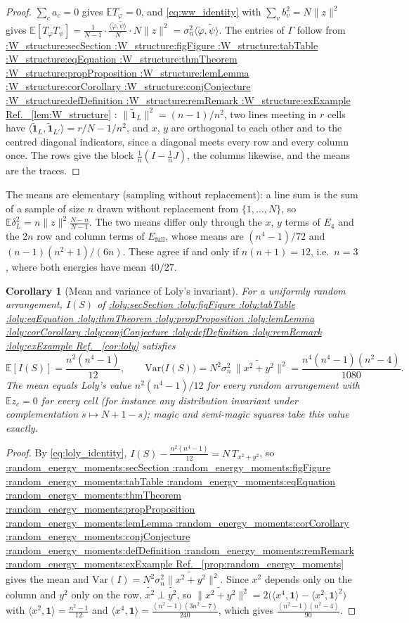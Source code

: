 \documentclass[11pt,a4paper]{article}
\makeatletter
\def\Cref@getprefix#1:#2\relax{#1}
\def\Cref@prefix@sec{sec}
\def\Cref@prefix@fig{fig}
\def\Cref@prefix@tab{tab}
\def\Cref@prefix@eq{eq}
\def\Cref@prefix@thm{thm}
\def\Cref@prefix@prop{prop}
\def\Cref@prefix@lem{lem}
\def\Cref@prefix@cor{cor}
\def\Cref@prefix@conj{conj}
\def\Cref@prefix@def{def}
\def\Cref@prefix@rem{rem}
\def\Cref@prefix@ex{ex}
\def\Cref@type@cap#1{%
  \edef\Cref@tmp{#1}%
  \ifx\Cref@tmp\Cref@prefix@sec Section%
  \else\ifx\Cref@tmp\Cref@prefix@fig Figure%
  \else\ifx\Cref@tmp\Cref@prefix@tab Table%
  \else\ifx\Cref@tmp\Cref@prefix@eq Equation%
  \else\ifx\Cref@tmp\Cref@prefix@thm Theorem%
  \else\ifx\Cref@tmp\Cref@prefix@prop Proposition%
  \else\ifx\Cref@tmp\Cref@prefix@lem Lemma%
  \else\ifx\Cref@tmp\Cref@prefix@cor Corollary%
  \else\ifx\Cref@tmp\Cref@prefix@conj Conjecture%
  \else\ifx\Cref@tmp\Cref@prefix@def Definition%
  \else\ifx\Cref@tmp\Cref@prefix@rem Remark%
  \else\ifx\Cref@tmp\Cref@prefix@ex Example%
  \else Ref.%
  \fi\fi\fi\fi\fi\fi\fi\fi\fi\fi\fi\fi
}
\DeclareRobustCommand{\Cref}[1]{%
  \begingroup
  \edef\Cref@label{#1}%
  \edef\Cref@prefix{\expandafter\Cref@getprefix\Cref@label:\relax}%
  \hyperref[#1]{\Cref@type@cap{\Cref@prefix}~\ref*{#1}}%
  \endgroup
}
\theoremstyle{plain}
\newtheorem{corollary}[theorem]{Corollary}
\theoremstyle{definition}
\theoremstyle{remark}
\newcommand{\Var}{\mathrm{Var}}
\newcommand{\Efull}{E_{\mathrm{full}}}
\newcommand{\Efour}{E_4}
\newcommand{\E}{\mathbb{E}}
\makeatother
\begin{document}
\begin{proof}
$\sum_ca_c=0$ gives $\E T_\varphi=0$, and \eqref{eq:ww_identity} with $\sum_vb_v^2=N\|z\|^2$ gives $\E[T_\varphi T_\psi]=\frac1{N-1}\cdot\frac{\langle\tilde\varphi,\tilde\psi\rangle}{N}\cdot N\|z\|^2=\sigma_n^2\langle\tilde\varphi,\tilde\psi\rangle$.
The entries of $\Gamma$ follow from \Cref{lem:W_structure}: $\|\tilde{\mathbf 1}_L\|^2=(n-1)/n^2$, two lines meeting in $r$ cells have $\langle\tilde{\mathbf 1}_L,\tilde{\mathbf 1}_{L'}\rangle=r/N-1/n^2$, and $x$, $y$ are orthogonal to each other and to the centred diagonal indicators, since a diagonal meets every row and every column once.
The rows give the block $\frac1n(I-\frac1nJ)$, the columns likewise, and the means are the traces.
\end{proof}

The means are elementary (sampling without replacement): a line sum is the sum of a sample of size $n$ drawn without replacement from $\{1,\dots,N\}$, so $\E\delta_L^2=n\|z\|^2\frac{N-n}{N-1}$.
The two means differ only through the $x$, $y$ terms of $\Efour$ and the $2n$ row and column terms of $\Efull$, whose means are $(n^4-1)/72$ and $(n-1)(n^2+1)/(6n)$.
These agree if and only if $n(n+1)=12$, i.e.\ $n=3$, where both energies have mean $40/27$.

\begin{corollary}[Mean and variance of Loly's invariant]
\label{cor:loly_null}
For a uniformly random arrangement, $I(S)$ of \Cref{cor:loly} satisfies
\begin{equation}
\E[I(S)]=\frac{n^{2}(n^{4}-1)}{12},\qquad
\Var\bigl(I(S)\bigr)=N^{2}\sigma_n^{2}\,\bigl\|\widetilde{x^2+y^2}\bigr\|^2=\frac{n^{4}(n^{4}-1)(n^{2}-4)}{1080}.
\label{eq:loly_null}
\end{equation}
The mean equals Loly's value $n^2(n^4-1)/12$ for every random arrangement with $\E z_c=0$ for every cell (for instance any distribution invariant under complementation $s\mapsto N+1-s$); magic and semi-magic squares take this value exactly.
\end{corollary}

\begin{proof}
By \eqref{eq:loly_identity}, $I(S)-\frac{n^2(n^4-1)}{12}=N\,T_{x^2+y^2}$, so \Cref{prop:random_energy_moments} gives the mean and $\Var(I)=N^2\sigma_n^2\|\widetilde{x^2+y^2}\|^2$.
Since $x^2$ depends only on the column and $y^2$ only on the row, $\widetilde{x^2}\perp\widetilde{y^2}$, so $\|\widetilde{x^2+y^2}\|^2=2\bigl(\langle x^4,\mathbf 1\rangle-\langle x^2,\mathbf 1\rangle^2\bigr)$ with $\langle x^2,\mathbf 1\rangle=\frac{n^2-1}{12}$ and $\langle x^4,\mathbf 1\rangle=\frac{(n^2-1)(3n^2-7)}{240}$, which gives $\frac{(n^2-1)(n^2-4)}{90}$.
\end{proof}
\end{document}
